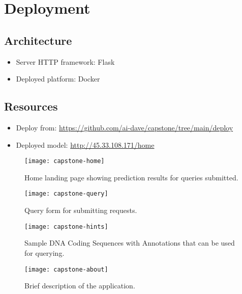 \section{Deployment}

\subsection{Architecture}
\begin{itemize}
  \item Server HTTP framework: Flask
  \item Deployed platform: Docker
\end{itemize}


\subsection{Resources}

\begin{itemize}
  \item Deploy from: \url{https://github.com/ai-dave/capstone/tree/main/deploy} 
  \item Deployed model: \url{http://45.33.108.171/home}
\end{itemize}


\begin{figure}
  \centering
  \texttt{[image: capstone-home]}
  \caption{%
     Home landing page showing prediction results for queries submitted.
  }
  \label{fig:capstone-home}
\end{figure}
%

\begin{figure}
  \centering
  \texttt{[image: capstone-query]}
  \caption{%
     Query form for submitting requests.
  }
  \label{fig:capstone-query}
\end{figure}
%

\begin{figure}
  \centering
  \texttt{[image: capstone-hints]}
  \caption{%
     Sample DNA Coding Sequences with Annotations that can be used for querying.
  }
  \label{fig:capstone-hints}
\end{figure}
%


\begin{figure}
  \centering
  \texttt{[image: capstone-about]}
  \caption{%
     Brief description of the application.
  }
  \label{fig:capstone-about}
\end{figure}
%